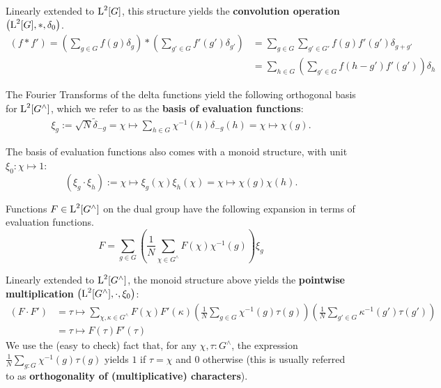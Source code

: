 Linearly extended to $\operatorname{L}^2[G]$, this structure yields the \textbf{convolution operation} $\left( \operatorname{L}^2[G],*,\delta_0 \right)$.
\begin{align}
\label{eqn_convolutionOperation}
  \left(f * f'\right) = \left(\sum_{g\in G} f(g) \delta_g \right) * \left( \sum_{g' \in  G} f'(g') \delta_{g'} \right) &= \sum_{g\in G} \sum_{g'\in G'} f(g) f'(g') \delta_{g+g'} \\ &= \sum_{h\in G} \left(\sum_{g'\in G} f(h-g') f'(g')\right) \delta_h
\end{align}

The Fourier Transforms of the delta functions yield the following orthogonal basis for $\operatorname{L}^2[G^\wedge]$, which we refer to as the \textbf{basis of evaluation functions}:
\begin{align*}
\xi_{g} := \sqrt{N}\tilde{\delta}_{-g} = \chi \mapsto \sum_{h \in G}\chi^{-1}(h)\delta_{-g}(h) = \chi \mapsto \chi(g).
\end{align*}

The basis of evaluation functions also comes with a monoid structure, with unit $\xi_0: \chi \mapsto 1$:
\begin{equation*}
  \left(\xi_g\cdot\xi_h\right):= \chi \mapsto \xi_g(\chi)\xi_h(\chi) = \chi \mapsto \chi(g)\chi(h).
\end{equation*}

Functions $F \in \operatorname{L}^2[G^\wedge]$ on the dual group have the following expansion in terms of evaluation functions.
\begin{equation*}
  F = \sum_{g\in G} \left( \frac{1}{N}\sum_{\chi \in G^\wedge} F(\chi) \chi^{-1}(g) \right) \xi_g
\end{equation*}

Linearly extended to $\operatorname{L}^2[G^\wedge]$, the monoid structure above yields the \textbf{pointwise multiplication} $\left( \operatorname{L}^2[G^\wedge],\cdot,\xi_0 \right)$: 
\begin{align}
\label{eqn_PointwiseMultCharacters}
  \left(F \cdot F' \right) &= \tau \mapsto \sum_{\chi,\kappa \in G^\wedge}  F(\chi)  F'(\kappa) \left(\frac{1}{N} \sum_{g\in G} \chi^{-1}(g)\tau(g)\right) \left(\frac{1}{N} \sum_{g'\in G}\kappa^{-1}(g') \tau(g') \right) \\ &= \tau \mapsto F(\tau) F'(\tau)
\end{align}
We use the (easy to check) fact that, for any $\chi,\tau : G^\wedge$, the expression $\frac{1}{N} \sum_{g:G}\chi^{-1}(g) \tau(g)$ yields $1$ if $\tau = \chi$ and $0$ otherwise (this is usually referred to as \textbf{orthogonality of (multiplicative) characters}).

